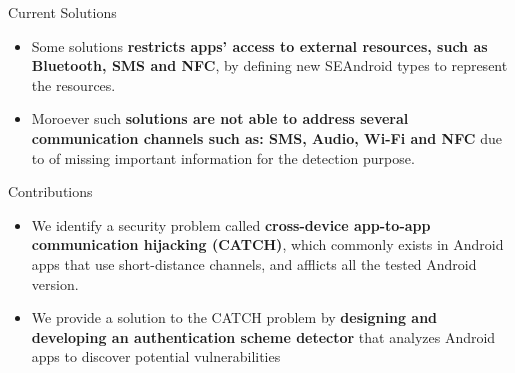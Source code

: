 \documentclass[10pt]{beamer}
\begin{document}
\begin{frame}[fragile]{Current Solutions}
  \begin{itemize}


  \item Some solutions {\bf restricts apps’ access to external
      resources, such as Bluetooth, SMS and NFC}, by defining new
    SEAndroid types to represent the resources.

  \item Moroever such {\bf solutions are not able to address several
      communication channels such as: SMS, Audio, Wi-Fi and NFC} due
    to of missing important information for the detection purpose.

  \end{itemize} 

  
\end{frame}


\begin{frame}[fragile]{Contributions}


 \begin{itemize}
  

 \item We identify a security problem called {\bf cross-device
     app-to-app communication hijacking (CATCH)}, which commonly
   exists in Android apps that use short-distance channels, and
   afflicts all the tested Android version.

 \item We provide a solution to the CATCH problem by {\bf designing
     and developing an authentication scheme detector} that analyzes
   Android apps to discover potential vulnerabilities


\end{itemize}
  
\end{frame}
\end{document}
